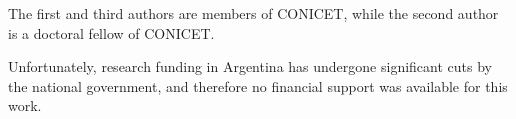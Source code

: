\documentclass{amsart}
\theoremstyle{remark}
\theoremstyle{definition}
\numberwithin{equation}{section}
\begin{document}
The first and third authors are members of CONICET, while the second author is a doctoral fellow of CONICET.

Unfortunately, research funding in Argentina has undergone significant cuts by the national government, and therefore no financial support was available for this work.



\end{document}
